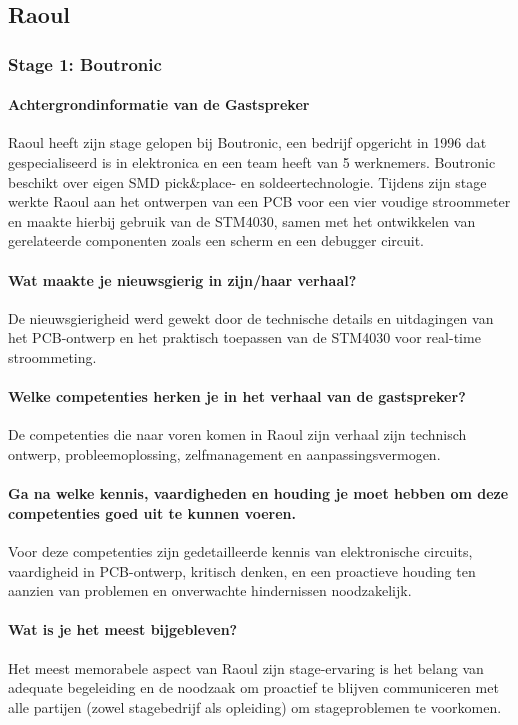 \subsection{Raoul}
\subsubsection{Stage 1: Boutronic}
\paragraph{Achtergrondinformatie van de Gastspreker}
Raoul heeft zijn stage gelopen bij Boutronic, een bedrijf opgericht in 1996 dat gespecialiseerd is in elektronica en een team heeft van 5 werknemers. Boutronic beschikt over eigen SMD pick\&place- en soldeertechnologie. Tijdens zijn stage werkte Raoul aan het ontwerpen van een PCB voor een vier voudige stroommeter en maakte hierbij gebruik van de STM4030, samen met het ontwikkelen van gerelateerde componenten zoals een scherm en een debugger circuit.

\paragraph{Wat maakte je nieuwsgierig in zijn/haar verhaal?}
De nieuwsgierigheid werd gewekt door de technische details en uitdagingen van het PCB-ontwerp en het praktisch toepassen van de STM4030 voor real-time stroommeting.

\paragraph{Welke competenties herken je in het verhaal van de gastspreker?}
De competenties die naar voren komen in Raoul zijn verhaal zijn technisch ontwerp, probleemoplossing, zelfmanagement en aanpassingsvermogen.

\paragraph{Ga na welke kennis, vaardigheden en houding je moet hebben om deze competenties goed uit te kunnen voeren.}
Voor deze competenties zijn gedetailleerde kennis van elektronische circuits, vaardigheid in PCB-ontwerp, kritisch denken, en een proactieve houding ten aanzien van problemen en onverwachte hindernissen noodzakelijk.


\paragraph{Wat is je het meest bijgebleven?}
Het meest memorabele aspect van Raoul zijn stage-ervaring is het belang van adequate begeleiding en de noodzaak om proactief te blijven communiceren met alle partijen (zowel stagebedrijf als opleiding) om stageproblemen te voorkomen.

